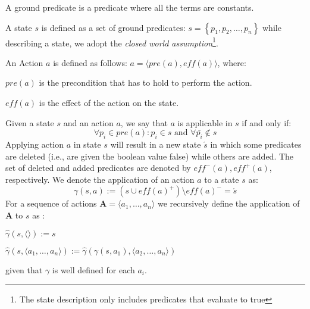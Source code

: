 \begin{Tdef}
    A ground predicate is a predicate where all the terms are constants.
\end{Tdef}
    
\begin{Tdef}[State]
    A state $s$ is defined as a set of ground predicates: $s = \left\{ p_1, p_2, \dots, p_n\right\}$
    while describing a state, we adopt the \textit{closed world assumption}\footnote{The state description only includes predicates that evaluate to true}.
\end{Tdef}
    
\begin{Tdef}[Action]
    An Action $a$ is defined as follows: $a = \langle pre(a), eff(a) \rangle$, where:
    \vspace{-0.5em}
    \begin{compactitem}
    \item 
    $pre(a)$ is the precondition that has to hold to perform the action.
    \item 
    $eff(a)$ is the effect of the action on the state.
    \end{compactitem}
\end{Tdef}

\begin{Tdef}
    Given a state $s$ and an action $a$, we say that $a$ is applicable in $s$ 
    if and only if:
    \vspace{-0.5em}
    $$\forall p_i \in pre(a): p_i\in s \text{ and } \forall \bar{p_i} \notin s$$
    Applying action $a$ in state $s$ will result in a new state $\acute{s}$
    in which some predicates are deleted 
    (i.e., are given the boolean value false) while others are added.
    The set of deleted and added predicates are denoted by $eff^-(a), eff^+(a)$, respectively.
    We denote the application of an action $a$ to a state $s$ as:
    \vspace{-0.5em}
    $$\gamma(s,a) := (s \cup eff(a)^+) \setminus eff(a)^- = \acute{s}$$
    For a sequence of actions $\mathbf{A} = \langle a_1,\dots,a_n \rangle$ we recursively define 
    the application of $\mathbf{A}$ to $s$ as :
    \vspace{-0.5em}
    \begin{compactitem}
    \item 
    $\hat{\gamma}(s,\langle \rangle) := s$
    \item 
    $\hat{\gamma}(s,\langle a_1,\dots,a_n\rangle) := \hat{\gamma}(\gamma(s,a_1),\langle a_2,\dots,a_n\rangle)$
    \end{compactitem}
    given that $\gamma$ is well defined for each $a_i$.
\end{Tdef}



